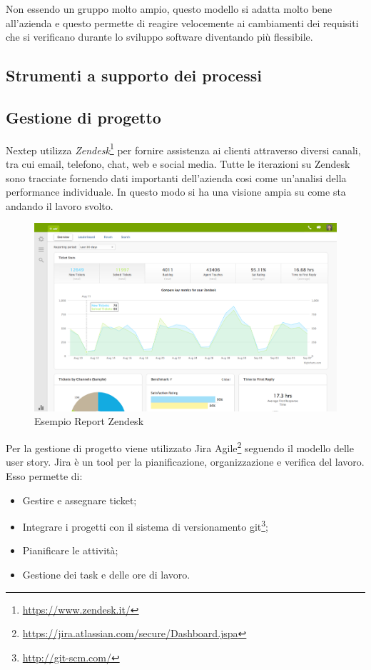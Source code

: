 Non essendo un gruppo molto ampio, questo modello si adatta molto bene all'azienda e questo permette di reagire velocemente ai cambiamenti dei requisiti che si verificano durante lo sviluppo software diventando più flessibile.

\subsection{Strumenti a supporto dei processi}
\subsection*{Gestione di progetto}
Nextep utilizza \textit{Zendesk}\footnote{\url{https://www.zendesk.it/}} per fornire assistenza ai clienti attraverso diversi canali, tra cui email, telefono, chat, web e social media. Tutte le iterazioni su Zendesk sono tracciate fornendo dati importanti dell'azienda cosi come un'analisi della performance individuale. In questo modo si ha una visione ampia su come sta andando il lavoro svolto.

\begin{figure}[h]
\centering
\includegraphics[width=0.8\linewidth]{immagini/reporting}
\caption[Esempio Report Zendesk]{Esempio Report Zendesk}
\label{fig:reporting}
\end{figure}

\newpage
Per la gestione di progetto viene utilizzato Jira Agile\footnote{\url{https://jira.atlassian.com/secure/Dashboard.jspa}} seguendo il modello delle user story. Jira è un tool per la pianificazione, organizzazione e verifica del lavoro. Esso permette di:
\begin{itemize}
	\item Gestire e assegnare ticket;
	\item Integrare i progetti con il sistema di versionamento \gls{git}\footnote{\url{http://git-scm.com/}};
	\item Pianificare le attività;
	\item Gestione dei task e delle ore di lavoro.
\end{itemize}

